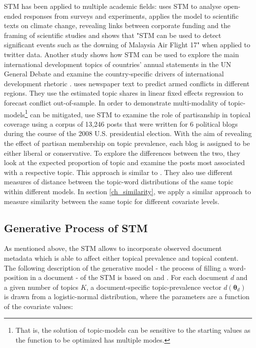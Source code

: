 \documentclass[12pt,a4paper,notitlepage]{article}
\begin{document}
STM has been applied to multiple academic fields: \citet{roberts_structural_2014} uses STM to analyse open-ended responses from surveys and experiments, \citet{farrell_corporate_2016} applies the model to scientific texts on climate change, revealing links between corporate funding and the framing of scientific studies and \citet{mishler_using_2015} shows that "STM can be used to detect significant events such as the downing of Malaysia Air Flight 17" when applied to twitter data. Another study shows how STM can be used to explore the main international development topics of countries’ annual statements in the UN General Debate and examine the country-specific drivers of international development rhetoric \citep{baturo_what_2017}. \citet{mueller_reading_2016} uses newspaper text to predict armed conflicts in different regions. They use the estimated topic shares in linear fixed effects regression to forecast conflict out-of-sample. In order to demonstrate multi-modality of topic-models\footnote{That is, the solution of topic-models can be sensitive to the starting values as the function to be optimized has multiple modes.} can be mitigated, \citep{roberts_navigating_2016} use STM to examine the role of partisanship in topical coverage using a corpus of 13,246 posts that were written for 6 political blogs during the course of the 2008 U.S. presidential election. With the aim of revealing the effect of partisan membership on topic prevalence, each blog is assigned to be either liberal or conservative. To explore the differences between the two, they look at the expected proportion of topic and examine the posts most associated with a respective topic. This approach is similar to \citet{roberts_model_2016}. They also use different measures of distance between the topic-word distributions of the same topic within different models. In section \ref{ch_similarity}, we apply a similar approach to measure similarity between the same topic for different covariate levels.

\subsection{Generative Process of STM}\label{ch_generativeProcess}

As mentioned above, the STM allows to incorporate observed document metadata which is able to affect either topical prevalence and topical content. The following description of the generative model - the process of filling a word-position in a document - of the STM is based on \citet{roberts_structural_2013} and \citet{roberts_stm:_2016}. For each document $d$ and a given number of topics $K$, a document-specific topic-prevalence vector $d(\boldsymbol{\theta}_d)$ is drawn from a logistic-normal distribution, where the parameters are a function of the covariate values:
\end{document}
